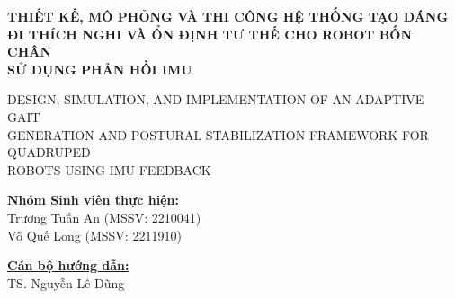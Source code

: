\documentclass[12pt,a4paper]{article}
\begin{document}
\vspace{0.2cm}

\begin{center}
    {\large \textbf{THIẾT KẾ, MÔ PHỎNG VÀ THI CÔNG HỆ THỐNG TẠO DÁNG \\
    ĐI THÍCH NGHI VÀ ỔN ĐỊNH TƯ THẾ CHO ROBOT BỐN CHÂN \\
    SỬ DỤNG PHẢN HỒI IMU}}
    
    \vspace{0.1cm}
    {\small DESIGN, SIMULATION, AND IMPLEMENTATION OF AN ADAPTIVE GAIT \\
    GENERATION AND POSTURAL STABILIZATION FRAMEWORK FOR QUADRUPED \\
    ROBOTS USING IMU FEEDBACK}
\end{center}

\vspace{0.3cm}

\noindent
\begin{minipage}[t]{0.55\textwidth}
    \underline{\textbf{Nhóm Sinh viên thực hiện:}} \\[0.1cm]
    {\small Trương Tuấn An (MSSV: 2210041)}\\
    {\small Võ Quế Long (MSSV: 2211910)}
\end{minipage}
\hfill
\begin{minipage}[t]{0.4\textwidth}
    \underline{\textbf{Cán bộ hướng dẫn:}} \\[0.1cm]
    {\small TS. Nguyễn Lê Dũng}
\end{minipage}

\vspace{0.4cm}
\end{document}
